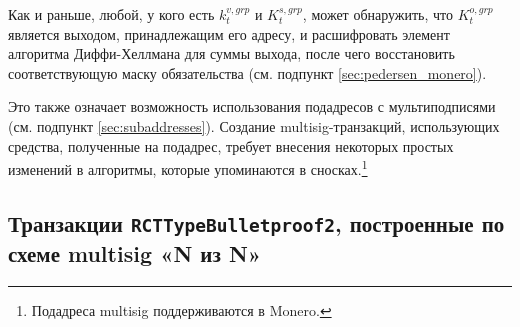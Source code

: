 Как и раньше, любой, у кого есть $k^{v,grp}_t$ и $K^{s,grp}_t$, может обнаружить, что $K^{o,grp}_t$ является выходом, принадлежащим его адресу, и расшифровать элемент алгоритма Диффи-Хеллмана для суммы выхода, после чего восстановить соответствующую маску обязательства (см. под\-пункт \ref{sec:pedersen_monero}). 

Это также означает возможность использования подадресов с мультиподписями (см. под\-пункт \ref{sec:subaddresses}). Создание multisig-транзакций, использующих средства, полученные на подадрес, требует внесения некоторых простых изменений в алгоритмы, которые упоминаются в снос\-ках.\footnote{Подадреса multisig поддерживаются в Monero.}


\subsection{Транзакции {\tt RCTTypeBulletproof2}, построенные по схеме multisig \linebreak «N из N»}
\label{sec:rcttypebulletproof2-multisig}

